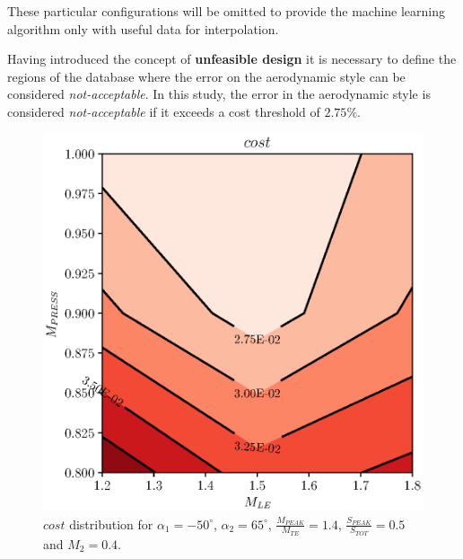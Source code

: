 These particular configurations will be omitted to provide the machine learning algorithm only with useful data for interpolation.

Having introduced the concept of \textbf{unfeasible design} it is necessary to define the regions of the 
database where the error on the aerodynamic style can be considered \textit{not-acceptable}. 
In this study, the error in the aerodynamic style is considered \textit{not-acceptable} if it exceeds a cost threshold of $2.75\%$. 

\begin{figure}[H]
    \centering
    \includegraphics[scale=\scaleContour]{./images/costError1.eps}
    \caption{$cost$ distribution for $\alpha_1 = -50^{\circ}$, $\alpha_2 = 65^{\circ}$, $\frac{M_{PEAK}}{M_{TE}} = 1.4$, $\frac{S_{PEAK}}{S_{TOT}} = 0.5$ and $M_2 = 0.4$.}
    \label{fig:errorDistribution1}
\end{figure}

